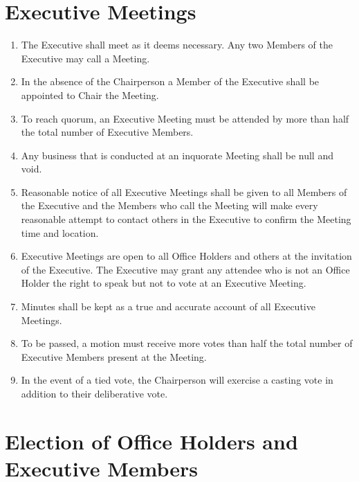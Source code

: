 \documentclass[a4paper]{article}
\begin{document}
	\section{Executive Meetings}
	
	\begin{enumerate}
		\item The Executive shall meet as it deems necessary. Any two Members of the Executive may call a Meeting.
		
		\item In the absence of the Chairperson a Member of the Executive shall be appointed to Chair the Meeting.
		
		\item To reach quorum, an Executive Meeting must be attended by more than half the total number of Executive Members.
		
		\item Any business that is conducted at an inquorate Meeting shall be null and void.
		
		\item Reasonable notice of all Executive Meetings shall be given to all Members of the Executive and the Members who call the Meeting will make every reasonable attempt to contact others in the Executive to confirm the Meeting time and location.
		
		\item Executive Meetings are open to all Office Holders and others at the invitation of the Executive.
		The Executive may grant any attendee who is not an Office Holder the right to speak but not to vote at an Executive Meeting.
		
		\item Minutes shall be kept as a true and accurate account of all Executive Meetings.
		
		\item To be passed, a motion must receive more votes than half the total number of Executive Members present at the Meeting.
		
		\item In the event of a tied vote, the Chairperson will exercise a casting vote in addition to their deliberative vote.

	\end{enumerate}
	
	\section{Election of Office Holders and Executive Members}
	
\end{document}
